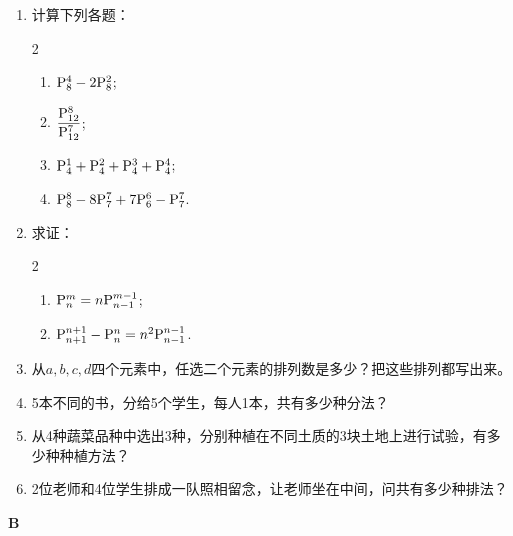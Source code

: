 \begin{enumerate}
    \item 计算下列各题：
\begin{multicols}{2}
\begin{enumerate}[(1)]
    \item $\perm{8}{4}-2\perm{8}{2}$;
    \item $\frac{\perm{12}{8}}{\perm{12}{7}}$;
    \item $\perm{4}{1}+\perm{4}{2}+\perm{4}{3}+\perm{4}{4}$;
        \item $\perm{8}{8}-8\perm{7}{7}+7\perm{6}{6}-\perm{7}{7}$.
\end{enumerate}
\end{multicols}

\item 求证：
\begin{multicols}{2}
\begin{enumerate}[(1)]
    \item $\perm{n}{m}=n\perm{n-1}{m-1}$;
    \item $\perm{n+1}{n+1}-\perm{n}{n}=n^{2}\perm{n-1}{n-1}$.
\end{enumerate}
\end{multicols}

  \item 从$a,b,c,d$四个元素中，任选二个元素的排列数是多少？把这些排列都写出来。
  \item 5本不同的书，分给5个学生，每人1本，共有多少种分法？

\item 从4种蔬菜品种中选出3种，分别种植在不同土质的3块土地上进行试验，有多少种种植方法？
\item 2位老师和4位学生排成一队照相留念，让老师坐在中间，问共有多少种排法？
\end{enumerate}

\begin{center}
    \bfseries B
\end{center}

